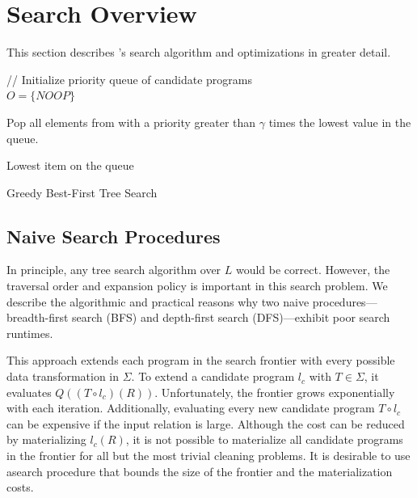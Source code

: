 \section{Search Overview}
This section describes \sys's search algorithm and optimizations in greater detail.    


\begin{algorithm}[t]

// Initialize priority queue of candidate programs\\
$O = \{NOOP\}$

{
    
    Pop all elements from with a priority greater than $\gamma$ times the lowest value in the queue.
}

\Return Lowest item on the queue
\caption{Greedy Best-First Tree Search }
\label{alg:main}
\end{algorithm}

\subsection{Naive Search Procedures}
In principle, any tree search algorithm over $L$ would be correct.
However, the traversal order and expansion policy is important in this search problem.  We describe the algorithmic and practical reasons why two naive procedures---breadth-first search (BFS) and depth-first search (DFS)---exhibit poor search runtimes.

 This approach extends each program in the search frontier with every possible data transformation in $\Sigma$.  To extend a candidate program $l_c$ with $T \in \Sigma$, it evaluates $Q((T\circ l_c)(R))$.  Unfortunately, the frontier grows exponentially with each iteration.  Additionally, evaluating every new candidate program $T\circ l_c$ can be expensive if the input relation is large.   Although the cost can be reduced by materializing $l_c(R)$, it is not possible to materialize all candidate programs in the frontier for all but the most trivial cleaning problems.    It is desirable to use asearch procedure that bounds the size of the frontier and the materialization costs.


